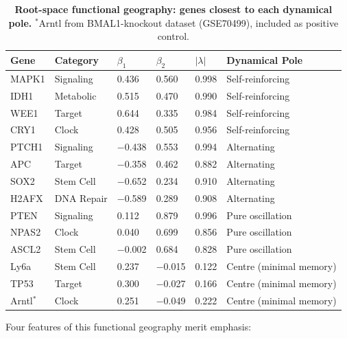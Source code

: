 \documentclass[11pt,a4paper]{article}
\begin{document}
\begin{table}[H]
\centering
\caption{\textbf{Root-space functional geography: genes closest to each dynamical pole.} $^*$Arntl from BMAL1-knockout dataset (GSE70499), included as positive control.}
\label{tab:rootspace_geography}
\begin{tabular}{p{2.5cm}p{2cm}p{1.5cm}p{1.5cm}p{1.5cm}p{3cm}}
\toprule
\textbf{Gene} & \textbf{Category} & \textbf{$\beta_1$} & \textbf{$\beta_2$} & \textbf{$|\lambda|$} & \textbf{Dynamical Pole} \\
\midrule
MAPK1 & Signaling & 0.436 & 0.560 & 0.998 & Self-reinforcing \\
IDH1 & Metabolic & 0.515 & 0.470 & 0.990 & Self-reinforcing \\
WEE1 & Target & 0.644 & 0.335 & 0.984 & Self-reinforcing \\
CRY1 & Clock & 0.428 & 0.505 & 0.956 & Self-reinforcing \\
\midrule
PTCH1 & Signaling & $-$0.438 & 0.553 & 0.994 & Alternating \\
APC & Target & $-$0.358 & 0.462 & 0.882 & Alternating \\
SOX2 & Stem Cell & $-$0.652 & 0.234 & 0.910 & Alternating \\
H2AFX & DNA Repair & $-$0.589 & 0.289 & 0.908 & Alternating \\
\midrule
PTEN & Signaling & 0.112 & 0.879 & 0.996 & Pure oscillation \\
NPAS2 & Clock & 0.040 & 0.699 & 0.856 & Pure oscillation \\
ASCL2 & Stem Cell & $-$0.002 & 0.684 & 0.828 & Pure oscillation \\
\midrule
Ly6a & Stem Cell & 0.237 & $-$0.015 & 0.122 & Centre (minimal memory) \\
TP53 & Target & 0.300 & $-$0.027 & 0.166 & Centre (minimal memory) \\
Arntl$^*$ & Clock & 0.251 & $-$0.049 & 0.222 & Centre (minimal memory) \\
\bottomrule
\end{tabular}
\end{table}

Four features of this functional geography merit emphasis:
\end{document}

